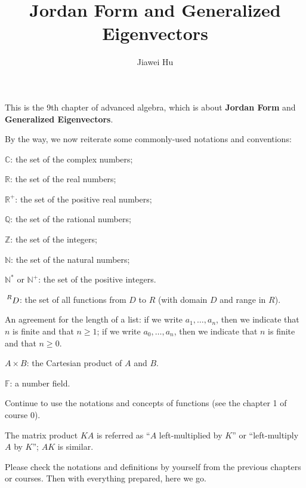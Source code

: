 \documentclass{article}
\title{\LARGE \textbf{Jordan Form and Generalized Eigenvectors}}
\author{\large Jiawei Hu}
\begin{document}
\maketitle

This is the 9th chapter of advanced algebra, which is about \textbf{Jordan Form} and \textbf{Generalized Eigenvectors}. 
 
By the way, we now reiterate some commonly-used notations and conventions:
\begin{compactenum}
    \item $\mathbb{C}$: the set of the complex numbers;
    \item $\mathbb{R}$: the set of the real numbers;
    \item $\mathbb{R}^+$: the set of the positive real numbers;
    \item $\mathbb{Q}$: the set of the rational numbers;
    \item $\mathbb{Z}$: the set of the integers;
    \item $\mathbb{N}$: the set of the natural numbers;
    \item $\mathbb{N^\ast}$ or $\mathbb{N}^+$: the set of the positive integers.
    \item $\sideset{^R}{}{\mathop{D}}$: the set of all functions from $D$ to $R$ (with domain $D$ and range in $R$).
    \item An agreement for the length of a list: if we write $a_1, \dots, a_n$, then we indicate that $n$ is finite and that $n\geq 1$; if we write $a_0, \dots, a_n$, then we indicate that $n$ is finite and that $n\geq 0$.
    \item $A\times B$: the Cartesian product of $A$ and $B$.
    \item $\mathbb{F}$: a number field.
    \item Continue to use the notations and concepts of functions (see the chapter 1 of course 0).
    \item The matrix product $KA$ is referred as ``$A$ left-multiplied by $K$'' or ``left-multiply $A$ by $K$''; $AK$ is similar.
\end{compactenum} 
Please check the notations and definitions by yourself from the previous chapters or courses. Then with everything prepared, here we go.
\end{document}
